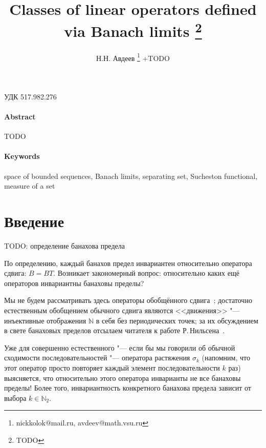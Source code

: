 \documentclass[a4paper,14pt]{article} %
\newcommand{\N}{\ensuremath{\mathbb{N}}}
\theoremstyle{plain}
\begin{document}

\title{
	Classes of linear operators defined via Banach limits
	\footnote{
		TODO
	}
}

\author{
	Н.Н. Авдеев
	\footnote{nickkolok@mail.ru, avdeev@math.vsu.ru}
	+TODO
}

\maketitle

УДК 517.982.276 %

\paragraph{Abstract}
TODO


\paragraph{Keywords}
	space of bounded sequences,
	Banach limits,
	separating set,
	Sucheston functional,
	measure of a set



\section{Введение}

TODO: определение банахова предела


По определению, каждый банахов предел инвариантен относительно оператора сдвига: $B=BT$.
Возникает закономерный вопрос: относительно каких ещё операторов инвариантны банаховы пределы?

Мы не будем рассматривать здесь операторы обобщённого сдвига~\cite{marchenko2006generalized,lewitan1945normed};
достаточно естественным обобщением обычного сдвига являются <<движения>> "--- инъективные отображения $\N$ в себя без периодических точек; за их обсуждением в свете банаховых пределов отсылаем читателя к работе Р.\,Нильсена~\cite{Nillsen}.

Уже для совершенно естественного "--- если бы мы говорили об обычной сходимости последовательностей "---
оператора растяжения $\sigma_k$
(напомним, что этот оператор просто повторяет каждый элемент последовательности $k$ раз)
выясняется, что относительно этого оператора инварианты не все банаховы пределы!
Более того, инвариантность конкретного банахова предела зависит от выбора $k\in\N_2$.
\end{document}
